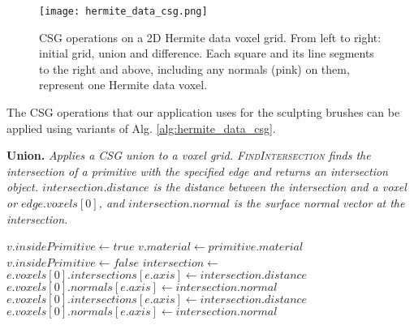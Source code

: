 \begin{figure}
\centering
\captionsetup{width=0.8\textwidth}
\texttt{[image: hermite\_data\_csg.png]}
\caption{CSG operations on a 2D Hermite data voxel grid. From left to right: initial grid, union and difference. Each square and its line segments to the right and above,
including any normals (pink) on them, represent one Hermite data voxel.}
\label{fig:hermite_data_csg}
\end{figure}

The CSG operations that our application uses for the sculpting brushes can be applied using variants of Alg. \ref{alg:hermite_data_csg}. 

\begin{algorithm}[H]
\caption{\textbf{Union.} \textit{Applies a CSG union to a voxel grid. \textsc{FindIntersection} finds the intersection of a primitive with the specified edge
and returns an intersection object. $intersection.distance$ is the distance between the intersection and a voxel or $edge.voxels[0]$, and $intersection.normal$ is the 
surface normal vector at the intersection.}}\label{alg:hermite_data_csg}
\begin{algorithmic}[1]
				\State $v.insidePrimitive \gets true$
				\State $v.material \gets primitive.material$
			\Else
				\State $v.insidePrimitive \gets false$
			\EndIf
	\EndFor
			\State $intersection \gets$ 
				\State $e.voxels[0].intersections[e.axis] \gets intersection.distance$
				\State $e.voxels[0].normals[e.axis] \gets intersection.normal$
				\State $e.voxels[0].intersections[e.axis] \gets intersection.distance$
				\State $e.voxels[0].normals[e.axis] \gets intersection.normal$
			\EndIf
		\EndIf
	\EndFor
\EndProcedure
\end{algorithmic}
\end{algorithm}

